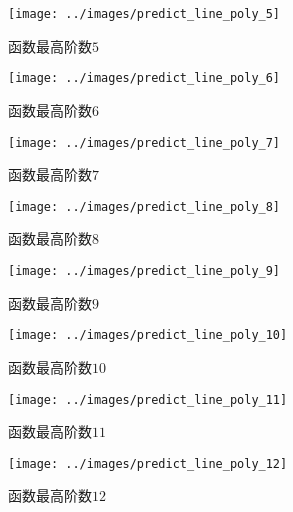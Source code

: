 \documentclass[UTF8]{article} %
\begin{document}
    \begin{figure}[H]
        \begin{minipage}[b]{0.24\linewidth}
            \centering
            \texttt{[image: ../images/predict\_line\_poly\_5]}
            \caption{函数最高阶数$5$}
            \label{fig:poly_5}
        \end{minipage}
        \begin{minipage}[b]{0.24\linewidth}
            \centering
            \texttt{[image: ../images/predict\_line\_poly\_6]}
            \caption{函数最高阶数$6$}
            \label{fig:poly_6}
        \end{minipage}
        \begin{minipage}[b]{0.24\linewidth}
            \centering
            \texttt{[image: ../images/predict\_line\_poly\_7]}
            \caption{函数最高阶数$7$}
            \label{fig:poly_7}
        \end{minipage}
        \begin{minipage}[b]{0.24\linewidth}
            \centering
            \texttt{[image: ../images/predict\_line\_poly\_8]}
            \caption{函数最高阶数$8$}
            \label{fig:poly_8}
        \end{minipage}
    \end{figure}

    \begin{figure}[H]
        \begin{minipage}[b]{0.24\linewidth}
            \centering
            \texttt{[image: ../images/predict\_line\_poly\_9]}
            \caption{函数最高阶数$9$}
            \label{fig:poly_9}
        \end{minipage}
        \begin{minipage}[b]{0.24\linewidth}
            \centering
            \texttt{[image: ../images/predict\_line\_poly\_10]}
            \caption{函数最高阶数$10$}
            \label{fig:poly_10}
        \end{minipage}
        \begin{minipage}[b]{0.24\linewidth}
            \centering
            \texttt{[image: ../images/predict\_line\_poly\_11]}
            \caption{函数最高阶数$11$}
            \label{fig:poly_11}
        \end{minipage}
        \begin{minipage}[b]{0.24\linewidth}
            \centering
            \texttt{[image: ../images/predict\_line\_poly\_12]}
            \caption{函数最高阶数$12$}
            \label{fig:poly_12}
        \end{minipage}
    \end{figure}
\end{document}
